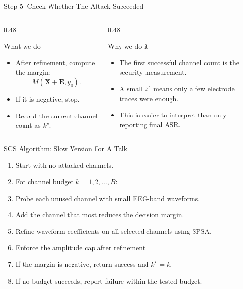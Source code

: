 \documentclass[aspectratio=169,11pt]{beamer}
\newcommand{\whatwhy}[2]{%
\begin{columns}[T,onlytextwidth]
  \begin{column}{0.48\textwidth}
    \begin{block}{What we do}
      #1
    \end{block}
  \end{column}
  \begin{column}{0.48\textwidth}
    \begin{block}{Why we do it}
      #2
    \end{block}
  \end{column}
\end{columns}
}
\begin{document}
\begin{frame}{Step 5: Check Whether The Attack Succeeded}
\whatwhy{
\begin{itemize}
  \item After refinement, compute the margin:
  \[
  M(\mathbf{X}+\mathbf{E},y_0).
  \]
  \item If it is negative, stop.
  \item Record the current channel count as \(k^\star\).
\end{itemize}
}{
\begin{itemize}
  \item The first successful channel count is the security measurement.
  \item A small \(k^\star\) means only a few electrode traces were enough.
  \item This is easier to interpret than only reporting final ASR.
\end{itemize}
}
\end{frame}

\begin{frame}{SCS Algorithm: Slow Version For A Talk}
\begin{enumerate}
  \item Start with no attacked channels.
  \item For channel budget \(k=1,2,\ldots,B\):
  \item Probe each unused channel with small EEG-band waveforms.
  \item Add the channel that most reduces the decision margin.
  \item Refine waveform coefficients on all selected channels using SPSA.
  \item Enforce the amplitude cap after refinement.
  \item If the margin is negative, return success and \(k^\star=k\).
  \item If no budget succeeds, report failure within the tested budget.
\end{enumerate}
\end{frame}
\end{document}
